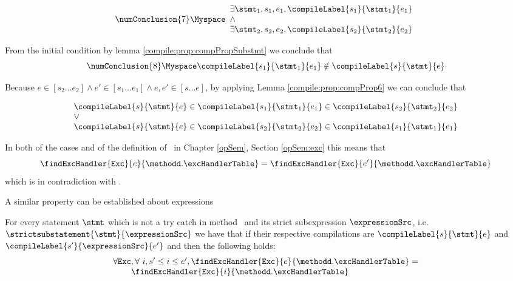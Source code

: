 $$ \numConclusion{7}  \Myspace \begin{array}{l}
        \exists \stmt_1, s_1, e_1, \compileLabel{s_1}{\stmt_1}{e_1} \\
	\wedge \\
	\exists \stmt_2, s_2, e_2,\compileLabel{s_2}{\stmt_2}{e_2}
\end{array}	 $$


From the initial condition  by lemma \ref{compile:prop:compPropSubstmt}  we conclude that 
$$\numConclusion{8} \Myspace \compileLabel{s_1}{\stmt_1}{e_1} \notin   \compileLabel{s}{\stmt}{e} $$


 Because $e \in [s_2 \ldots e_2 ]  \wedge  e' \in [s_1 \ldots e_1 ] \wedge e,e' \in [s \ldots e]$,  by applying 
  Lemma \ref{compile:prop:compProp6}  we can conclude that

 $$  \begin{array}{l} 
          \compileLabel{s}{\stmt}{e} \in \compileLabel{s_1}{\stmt_1}{e_1} \in  \compileLabel{s_2}{\stmt_2}{e_2} \\
           \vee \\
	 \compileLabel{s}{\stmt}{e} \in   \compileLabel{s_2}{\stmt_2}{e_2} \in \compileLabel{s_1}{\stmt_1}{e_1}
 \end{array}$$	   

 In both of the cases and of the definition of \findExcHandlerOnly \ in Chapter \ref{opSem}, Section \ref{opSem:exc}  this means that 
$$ \findExcHandler{\mbox{\rm\tt{Exc}} }{e}{\methodd.\excHandlerTable} = \findExcHandler{\mbox{\rm\tt{Exc}} }{e'}{\methodd.\excHandlerTable} $$
which is in contradiction with .


A similar property can be established about expressions
 
\begin{compProp9}\label{compile:prop:compProp9}
  For every statement $\stmt$ which is not a try catch  in method \methodd \  and  its strict  subexpression
 $\expressionSrc$, i.e. $\strictsubstatement{\stmt}{\expressionSrc}$
 we have that 
if their respective compilations are  $\compileLabel{s}{\stmt}{e}$ and  $\compileLabel{s'}{\expressionSrc}{e'}$ and 
 then the following holds:
$$ \begin{array}{l}
          \forall \mbox{\rm\tt{Exc}}, \forall  \ i, s' \le i \le e' ,  \findExcHandler{\mbox{\rm\tt{Exc}} }{e}{\methodd.\excHandlerTable} = \\
	  \phantom{\forall \mbox{\rm\tt{Exc}} }\findExcHandler{\mbox{\rm\tt{Exc}} }{i}{\methodd.\excHandlerTable} 
   \end{array}
$$
\end{compProp9}

